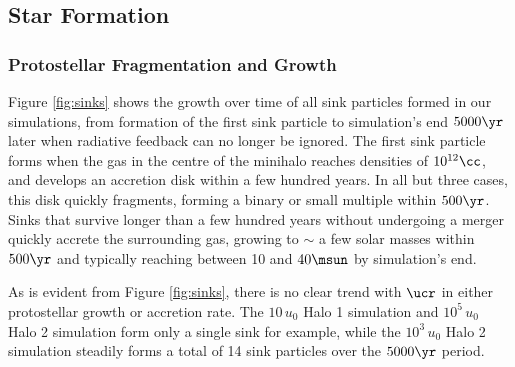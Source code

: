 \subsection{Star Formation}
\subsubsection{Protostellar Fragmentation and Growth}
\label{subsec:sink_formation}

Figure \ref{fig:sinks} shows the growth over time of all sink particles formed in our simulations, from formation of the first sink particle to simulation's end $5000\yr$ later when radiative feedback can no longer be ignored. 
The first sink particle forms when the gas in the centre of the minihalo reaches densities of $10^{12}\cc$, and develops an accretion disk within a few hundred years. 
In all but three cases, this disk quickly fragments, forming a binary or small multiple within $500\yr$. 
Sinks that survive longer than a few hundred years without undergoing a merger quickly accrete the surrounding gas, growing to $\sim$ a few solar masses within $500\yr$ and typically reaching between 10 and $40\msun$ by simulation's end.

As is evident from Figure \ref{fig:sinks}, there is no clear trend with $\ucr$ in either protostellar growth or accretion rate.
The $10\,u_0$ Halo 1 simulation and $10^5\,u_0$ Halo 2 simulation form only a single sink for example, while the $10^3\,u_0$ Halo 2 simulation steadily forms a total of 14 sink particles over the $5000\yr$ period.
